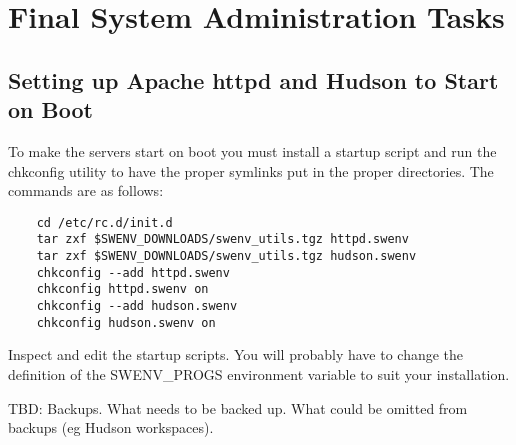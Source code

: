 
\section{Final System Administration Tasks}

\subsection{Setting up Apache httpd and Hudson to Start on Boot}

To make the servers start on boot you must install a startup
script and run the chkconfig utility to have the proper symlinks
put in the proper directories.  The commands are as follows:

\begin{verbatim}
    cd /etc/rc.d/init.d
    tar zxf $SWENV_DOWNLOADS/swenv_utils.tgz httpd.swenv
    tar zxf $SWENV_DOWNLOADS/swenv_utils.tgz hudson.swenv
    chkconfig --add httpd.swenv
    chkconfig httpd.swenv on
    chkconfig --add hudson.swenv
    chkconfig hudson.swenv on
\end{verbatim}

Inspect and edit the startup scripts.  You will probably
have to change the definition of the SWENV\_PROGS environment
variable to suit your installation.


TBD: Backups.  What needs to be backed up.  What could be omitted from
backups (eg Hudson workspaces).


